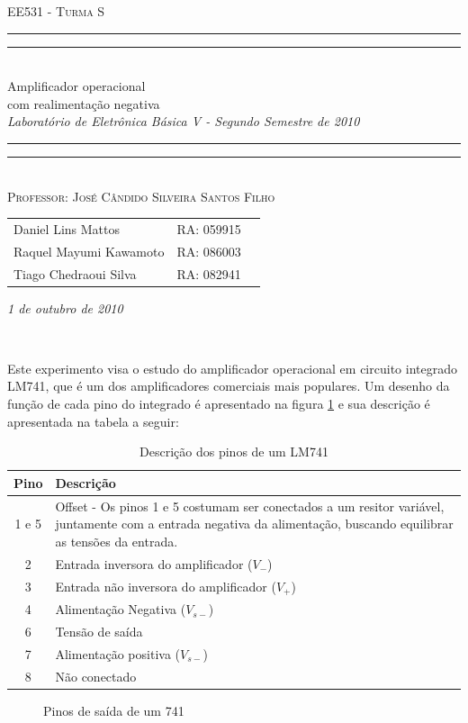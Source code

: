 \documentclass[brazil]{article}
\date{Novembro 12, 2010}
\newcommand*{\titleTMB}{\begingroup \centering \settowidth{\unitlength}{\LARGE EE531} {\large\scshape EE531 - Turma S}\\[0.2\baselineskip] \rule{11.0cm}{1.6pt}\vspace*{-\baselineskip}\vspace*{2pt} \rule{11.0cm}{0.4pt}\\[\baselineskip] {\LARGE  Amplificador operacional \\ com realimentação negativa}\\\vspace*{\baselineskip}  {\itshape Laboratório de Eletrônica Básica V - Segundo Semestre de 2010}\\ \rule{11.0cm}{0.4pt}\vspace*{-\baselineskip}\vspace{3.2pt} \rule{11.0cm}{1.6pt}\\[\baselineskip] {\large\scshape Professor: José Cândido Silveira Santos Filho}\par \vfill {\normalsize   \scshape 
    \begin{center} 
      \begin{tabular}{  l  l  p{5cm} } 
 	Daniel Lins Mattos & RA: 059915\\
        Raquel Mayumi Kawamoto & RA: 086003\\
        Tiago Chedraoui Silva  & RA: 082941\\
      \end{tabular} \end{center}
    \itshape 1 de outubro de 2010    }\\[\baselineskip] \vspace{3.2pt} \endgroup}
\begin{document}
\titleTMB \newpage{}


Este experimento visa o estudo do  amplificador operacional em circuito integrado LM741, que é um dos amplificadores comerciais mais populares.
Um desenho da função de cada pino do integrado é apresentado na figura \ref{circ:1} e sua descrição é apresentada na tabela a seguir:

\begin{table}[H]
\begin{center}
\caption{Descrição dos pinos de um LM741}
\begin{tabular}{cp{10cm}}
\hline 
Pino & Descrição\tabularnewline
\hline
\hline 
1 e 5 & Offset - Os pinos 1 e 5 costumam ser conectados a um resitor variável, juntamente com a entrada negativa da alimentação, buscando equilibrar as tensões da entrada.\tabularnewline
\hline 
2 & Entrada inversora do amplificador ($V_-$) \tabularnewline
\hline 
3 & Entrada não inversora do amplificador ($V_+$)\tabularnewline
\hline 
4 & Alimentação Negativa ($V_{s-}$)\tabularnewline
\hline 
6 & Tensão de saída\tabularnewline
\hline 
7 & Alimentação positiva ($V_{s-}$)\tabularnewline
\hline 
8 & Não conectado\tabularnewline
\hline
\end{tabular}
\end{center}
\end{table}

\vspace{3mm}
\begin{figure}[h]
\centerline{}
\caption{Pinos de saída de um 741 \label{circ:1}}
\end{figure}
\end{document}
